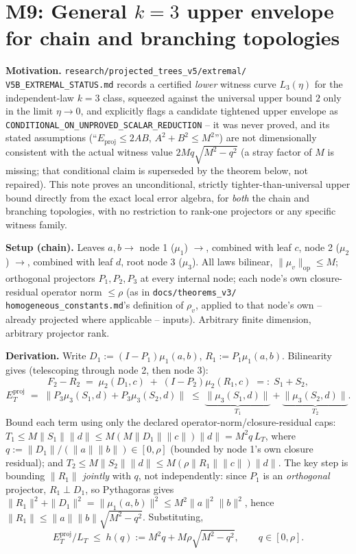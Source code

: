 \section*{M9: General $k=3$ upper envelope for chain and branching topologies}
\label{sec:k3-upper-envelope}

\textbf{Motivation.} \texttt{research/projected\_trees\_v5/extremal/
V5B\_EXTREMAL\_STATUS.md} records a certified \emph{lower} witness curve
$L_3(\eta)$ for the independent-law $k=3$ class, squeezed against the
universal upper bound $2$ only in the limit $\eta\to0$, and explicitly
flags a candidate tightened upper envelope as
\texttt{CONDITIONAL\_ON\_UNPROVED\_SCALAR\_REDUCTION} -- it was never
proved, and its stated assumptions (``$E_{\mathrm{proj}}\le2AB$,
$A^2+B^2\le M^2$'') are not dimensionally consistent with the actual
witness value $2Mq\sqrt{M^2-q^2}$ (a stray factor of $M$ is missing; that
conditional claim is superseded by the theorem below, not repaired).
This note proves an unconditional, strictly tighter-than-universal upper
bound directly from the exact local error algebra, for \emph{both} the
chain and branching topologies, with no restriction to rank-one
projectors or any specific witness family.

\textbf{Setup (chain).} Leaves $a,b\to$ node 1 ($\mu_1$) $\to$, combined
with leaf $c$, node 2 ($\mu_2$) $\to$, combined with leaf $d$, root node 3
($\mu_3$). All laws bilinear, $\|\mu_v\|_{\mathrm{op}}\le M$; orthogonal
projectors $P_1,P_2,P_3$ at every internal node; each node's own closure-
residual operator norm $\le\rho$ (as in \texttt{docs/theorems\_v3/
homogeneous\_constants.md}'s definition of $\rho_v$, applied to that
node's own -- already projected where applicable -- inputs). Arbitrary
finite dimension, arbitrary projector rank.

\textbf{Derivation.} Write $D_1:=(I-P_1)\mu_1(a,b)$, $R_1:=P_1\mu_1(a,b)$.
Bilinearity gives (telescoping through node 2, then node 3):
\[
  F_2-R_2 \;=\; \mu_2(D_1,c) \;+\; (I-P_2)\mu_2(R_1,c) \;=:\; S_1+S_2,
\]
\[
  E_T^{\mathrm{proj}} \;=\; \big\|P_3\mu_3(S_1,d)+P_3\mu_3(S_2,d)\big\|
  \;\le\; \underbrace{\|\mu_3(S_1,d)\|}_{T_1} + \underbrace{\|\mu_3(S_2,d)\|}_{T_2}.
\]
Bound each term using only the declared operator-norm/closure-residual
caps: $T_1\le M\|S_1\|\|d\|\le M(M\|D_1\|\|c\|)\|d\|=M^2q\,L_T$, where
$q:=\|D_1\|/(\|a\|\|b\|)\in[0,\rho]$ (bounded by node 1's own closure
residual); and $T_2\le M\|S_2\|\|d\|\le M(\rho\|R_1\|\|c\|)\|d\|$. The key
step is bounding $\|R_1\|$ \emph{jointly} with $q$, not independently: since
$P_1$ is an \emph{orthogonal} projector, $R_1\perp D_1$, so Pythagoras gives
$\|R_1\|^2+\|D_1\|^2=\|\mu_1(a,b)\|^2\le M^2\|a\|^2\|b\|^2$, hence
$\|R_1\|\le\|a\|\|b\|\sqrt{M^2-q^2}$. Substituting,
\[
  \boxed{\;E_T^{\mathrm{proj}}/L_T \;\le\; h(q) := M^2q + M\rho\sqrt{M^2-q^2}, \qquad q\in[0,\rho].\;}
\]

